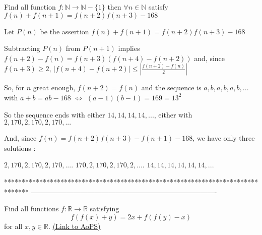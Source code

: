 \begin{solution}
	\begin{tcolorbox}Find all function $ f: \mathbb{N} \rightarrow \mathbb{N} - \{1\}$  then $ \forall n \in \mathbb{N}$ satisfy $ f(n) + f(n + 1) = f(n + 2)f(n + 3) - 168$\end{tcolorbox}

Let $ P(n)$ be the assertion $ f(n)+f(n+1)=f(n+2)f(n+3)-168$

Subtracting $ P(n)$ from $ P(n+1)$ implies $ f(n+2)-f(n)=f(n+3)(f(n+4)-f(n+2))$ and, since $ f(n+3)\geq 2$, $ |f(n+4)-f(n+2)|\leq|\frac{f(n+2)-f(n)}2|$ 

So, for $ n$ great enough, $ f(n+2)=f(n)$ and the sequence is $ a,b,a,b,a,b,...$ with $ a+b=ab-168$ $ \iff$ $ (a-1)(b-1)=169=13^2$

So the sequence ends with either $ 14,14,14,14, ...$, either with $ 2,170,2,170,2,170, ...$

And, since $ f(n)=f(n+2)f(n+3)-f(n+1)-168$, we have only three solutions :

$ 2,170,2,170,2,170, ....$
$ 170,2,170,2,170,2, ....$
$ 14,14,14,14,14,14,...$
\end{solution}
*******************************************************************************
-------------------------------------------------------------------------------

\begin{problem}
	Find all functions $ f: \mathbb R \rightarrow \mathbb R$ satisfying
\[ f(f(x) + y) = 2x + f(f(y) - x)\] for all $x,y \in \mathbb R$.
	\flushright \href{https://artofproblemsolving.com/community/c6h303332}{(Link to AoPS)}
\end{problem}



